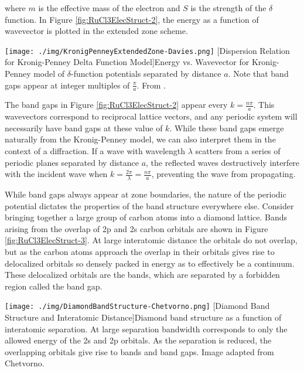 where $m$ is the effective mass of the electron and $S$ is the strength of the $\delta$ function. In Figure \ref{fig:RuCl3ElecStruct-2}, the energy as a function of wavevector is plotted in the extended zone scheme.

\begin{centering}
\texttt{[image: ./img/KronigPenneyExtendedZone-Davies.png]}
  \captionsetup{width=0.75\textwidth}
  [Dispersion Relation for Kronig-Penney Delta Function Model]{Energy vs. Wavevector for Kronig-Penney model of $\delta$-function potentials separated by distance $a$. Note that band gaps appear at integer multiples of $\frac{\pi}{a}$. From \cite{Davies1997}.} 
  \label{fig:RuCl3ElecStruct-2}
\end{centering}

The band gaps in Figure \ref{fig:RuCl3ElecStruct-2} appear every $k = \frac{n\pi}{a}$. This wavevectors correspond to reciprocal lattice vectors, and any periodic system will necessarily have band gaps at these value of $k$. While these band gaps emerge naturally from the Kronig-Penney model, we can also interpret them in the context of a diffraction. If a wave with wavelength $\lambda$ scatters from a series of periodic planes separated by distance $a$, the reflected waves destructively interfere with the incident wave when $k = \frac{2\pi}{\lambda} = \frac{n \pi}{a}$, preventing the wave from propagating.

While band gaps always appear at zone boundaries, the nature of the periodic potential dictates the properties of the band structure everywhere else. Consider bringing together a large group of carbon atoms into a diamond lattice. Bands arising from the overlap of 2p and 2s carbon orbitals are shown in Figure \ref{fig:RuCl3ElecStruct-3}.  At large interatomic distance the orbitals do not overlap, but as the carbon atoms approach the overlap in their orbitals gives rise to delocalized orbitals so densely packed in energy as to effectively be a continuum. These delocalized orbitals are the bands, which are separated by a forbidden region called the band gap.

\begin{centering}
\texttt{[image: ./img/DiamondBandStructure-Chetvorno.png]}
  \captionsetup{width=0.75\textwidth}
  [Diamond Band Structure and Interatomic Distance]{Diamond band structure as a function of interatomic separation. At large separation bandwidth corresponds to only the allowed energy of the 2s and 2p orbitals. As the separation is reduced, the overlapping orbitals give rise to bands and band gaps. Image adapted from Chetvorno.} 
  \label{fig:RuCl3ElecStruct-3}
\end{centering}

